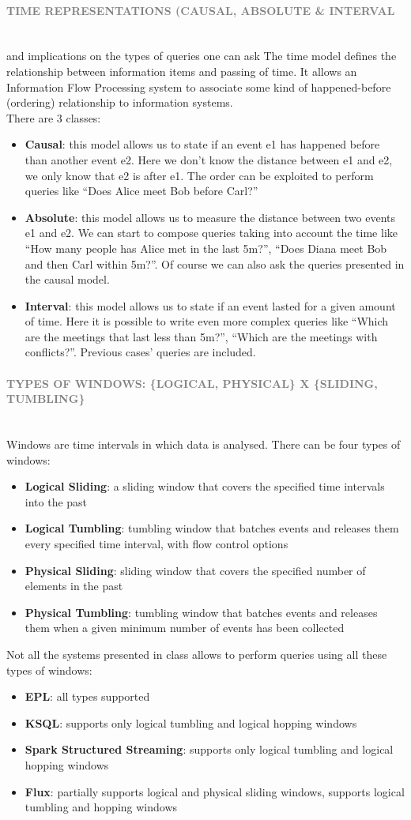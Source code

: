\documentclass[10pt,a4paper]{article}
\newcommand{\myparagraph}[1]{\paragraph{\normalsize{\textcolor{gray}{\uppercase{\textbf{#1}}}} }\mbox{} \vspace{0.5em}\\}
\begin{document}
\myparagraph{Time representations (Causal, Absolute \& Interval} and implications on the types of queries one can ask
The time model defines the relationship between information items and passing of time. It allows an Information Flow Processing system to associate some kind of happened-before (ordering) relationship to information systems. \\
There are 3 classes:
\begin{itemize}
	\item \textbf{Causal}: this model allows us to state if an event e1 has happened before than another event e2. Here we don’t know the distance between e1 and e2, we only know that e2 is after e1. The order can be exploited to perform queries like “Does Alice meet Bob before Carl?”
	\item \textbf{Absolute}: this model allows us to measure the distance between two events e1 and e2. We can start to compose queries taking into account the time like “How many people has Alice met in the last 5m?”, “Does Diana meet Bob and then Carl within 5m?”. Of course we can also ask the queries presented in the causal model.
	\item \textbf{Interval}: this model allows us to state if an event lasted for a given amount of time. Here it is possible to write even more complex queries like “Which are the meetings that last less than 5m?”, “Which are the meetings with conflicts?”. Previous cases’ queries are included.
\end{itemize}

\myparagraph{Types of windows: \{logical, physical\} x \{sliding, tumbling\}}
		
Windows are time intervals in which data is analysed. 
There can be four types of windows:
\begin{itemize}
	\item \textbf{Logical Sliding}: a sliding window that covers the specified time intervals into the past
	\item \textbf{Logical Tumbling}: tumbling window that batches events and releases them every specified time interval, with flow control options
	\item \textbf{Physical Sliding}: sliding window that covers the specified number of elements in the past
	\item \textbf{Physical Tumbling}: tumbling window that batches events and releases them when a given minimum number of events has been collected
\end{itemize}
Not all the systems presented in class allows to perform queries using all these types of windows:
\begin{itemize}
	\item \textbf{EPL}: all types supported
	\item \textbf{KSQL}: supports only logical tumbling and logical hopping windows
	\item \textbf{Spark Structured Streaming}: supports only logical tumbling and logical hopping windows
	\item \textbf{Flux}: partially supports logical and physical sliding windows, supports logical tumbling and hopping windows
\end{itemize}
\end{document}
